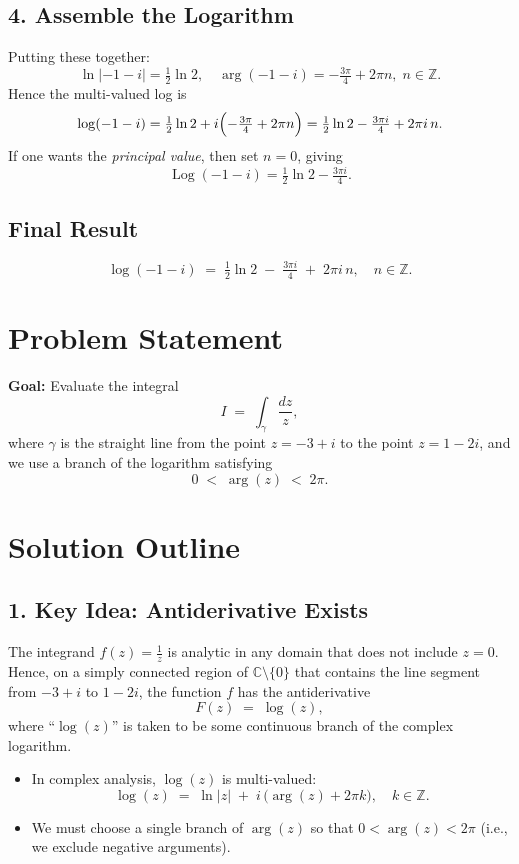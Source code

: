 \documentclass[12pt]{article}
\DeclareMathOperator{\Log}{Log}
\theoremstyle{definition} %
\theoremstyle{plain} %
\begin{document}
\subsection*{4. Assemble the Logarithm}
Putting these together:
\[
\ln\lvert -1 - i\rvert = \tfrac12 \ln 2, 
\quad
\arg(-1 - i) = -\tfrac{3\pi}{4} + 2\pi n, \; n\in\mathbb{Z}.
\]
Hence the multi-valued log is
\[
\log(-1 - i)
= \tfrac12 \ln 2 + i\Bigl(-\tfrac{3\pi}{4} + 2\pi n\Bigr)
= \tfrac12 \ln 2 - \tfrac{3\pi i}{4} + 2\pi i\,n.
\]
If one wants the \emph{principal value}, then set \(n=0\), giving
\[
\Log(-1 - i) = \tfrac12 \ln 2 - \tfrac{3\pi i}{4}.
\]

\subsection*{Final Result}
\[
\boxed{
\log(-1 - i) \;=\;
\tfrac12 \ln 2 
\;-\;
\tfrac{3\pi i}{4}
\;+\;
2\pi i\,n,
\quad n\in\mathbb{Z}.
}
\]

\section*{Problem Statement}

\textbf{Goal:} Evaluate the integral
\[
I \;=\;\int_{\gamma}\frac{dz}{z},
\]
where $\gamma$ is the straight line from the point $z=-3+i$ to the point $z=1-2i$, and we use a branch of the logarithm satisfying
\[
0 \;<\; \arg(z) \;<\; 2\pi.
\]

\section*{Solution Outline}

\subsection*{1. Key Idea: Antiderivative Exists}

The integrand $f(z)=\tfrac{1}{z}$ is analytic in any domain that does not include $z=0$. Hence, on a simply connected region of $\mathbb{C}\setminus\{0\}$ that contains the line segment from $-3+i$ to $1-2i$, the function $f$ has the antiderivative 
\[
F(z) \;=\;\log(z),
\]
where ``$\log(z)$'' is taken to be some continuous branch of the complex logarithm.

\begin{itemize}
\item In complex analysis, $\log(z)$ is multi-valued:
\[
\log(z) \;=\;\ln|z|\;+\; i\,\bigl(\arg(z)+2\pi k\bigr),\quad k\in \mathbb{Z}.
\]
\item We must choose a single branch of $\arg(z)$ so that $0<\arg(z)<2\pi$ (i.e., we exclude negative arguments).
\end{itemize}
\end{document}
